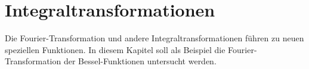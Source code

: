 %
%
%
\chapter{Integraltransformationen
\label{buch:chapter:fourier}}
Die Fourier-Transformation und andere Integraltransformationen
führen zu neuen speziellen Funktionen.
In diesem Kapitel soll als Beispiel die Fourier-Transformation
der Bessel-Funktionen untersucht werden.







